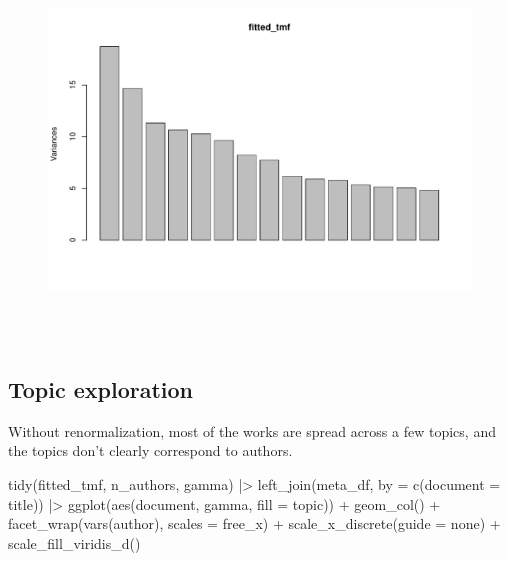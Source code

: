 \documentclass[
]{article}
\newenvironment{Shaded}{\begin{snugshade}}{\end{snugshade}}
\newcommand{\AttributeTok}[1]{\textcolor[rgb]{0.40,0.45,0.13}{#1}}
\newcommand{\FunctionTok}[1]{\textcolor[rgb]{0.28,0.35,0.67}{#1}}
\newcommand{\NormalTok}[1]{\textcolor[rgb]{0.00,0.23,0.31}{#1}}
\newcommand{\OtherTok}[1]{\textcolor[rgb]{0.00,0.23,0.31}{#1}}
\newcommand{\SpecialCharTok}[1]{\textcolor[rgb]{0.37,0.37,0.37}{#1}}
\newcommand{\StringTok}[1]{\textcolor[rgb]{0.13,0.47,0.30}{#1}}
\begin{document}
\begin{figure}[H]

{\centering \includegraphics[width=6in,height=4in]{paper_files/figure-pdf/unnamed-chunk-47-1.pdf}

}

\end{figure}

\hypertarget{topic-exploration}{%
\subsection{Topic exploration}\label{topic-exploration}}

Without renormalization, most of the works are spread across a few
topics, and the topics don't clearly correspond to authors.

\begin{Shaded}
\begin{Highlighting}[]
\FunctionTok{tidy}\NormalTok{(fitted\_tmf, n\_authors, }\StringTok{\textquotesingle{}gamma\textquotesingle{}}\NormalTok{) }\SpecialCharTok{|\textgreater{}} 
    \FunctionTok{left\_join}\NormalTok{(meta\_df, }\AttributeTok{by =} \FunctionTok{c}\NormalTok{(}\StringTok{\textquotesingle{}document\textquotesingle{}} \OtherTok{=} \StringTok{\textquotesingle{}title\textquotesingle{}}\NormalTok{)) }\SpecialCharTok{|\textgreater{}} 
    \FunctionTok{ggplot}\NormalTok{(}\FunctionTok{aes}\NormalTok{(document, gamma, }\AttributeTok{fill =}\NormalTok{ topic)) }\SpecialCharTok{+}
    \FunctionTok{geom\_col}\NormalTok{() }\SpecialCharTok{+}
    \FunctionTok{facet\_wrap}\NormalTok{(}\FunctionTok{vars}\NormalTok{(author), }\AttributeTok{scales =} \StringTok{\textquotesingle{}free\_x\textquotesingle{}}\NormalTok{) }\SpecialCharTok{+}
    \FunctionTok{scale\_x\_discrete}\NormalTok{(}\AttributeTok{guide =} \StringTok{\textquotesingle{}none\textquotesingle{}}\NormalTok{) }\SpecialCharTok{+}
    \FunctionTok{scale\_fill\_viridis\_d}\NormalTok{()}
\end{Highlighting}
\end{Shaded}
\end{document}
